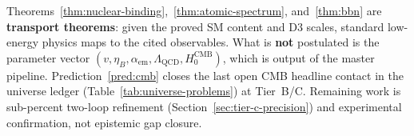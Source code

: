\begin{remark}
Theorems~\ref{thm:nuclear-binding},~\ref{thm:atomic-spectrum},
and~\ref{thm:bbn} are \textbf{transport theorems}: given the proved SM
content and D3 scales, standard low-energy physics maps to the cited
observables. What is \textbf{not} postulated is the parameter vector
$(v,\eta_B,\alpha_{\mathrm{em}},\Lambda_{\mathrm{QCD}},H_0^{\mathrm{CMB}})$,
which is output of the master pipeline. Prediction~\ref{pred:cmb} closes the
last open CMB headline contact in the universe ledger
(Table~\ref{tab:universe-problems}) at Tier~B/C. Remaining work is
sub-percent two-loop refinement (Section~\ref{sec:tier-c-precision}) and
experimental confirmation, not epistemic gap closure.
\end{remark}